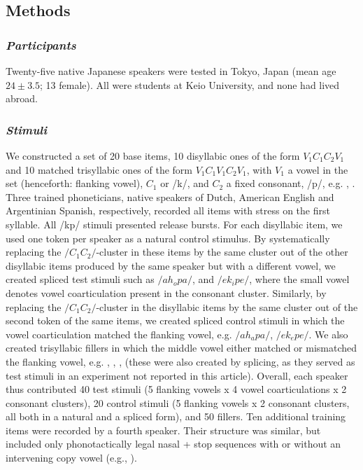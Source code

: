 \subsection{Methods}

\subsubsection{\textit{Participants}}

Twenty-five native Japanese speakers were tested in Tokyo, Japan (mean age $24 \pm 3.5$; 13 female). All were students at Keio University, and none had lived abroad. 

\subsubsection{\textit{Stimuli}}

We constructed a set of 20 base items, 10 disyllabic ones of the form $V_{1}C_{1}C_{2}V_{1}$ and 10 matched trisyllabic ones of the form $V_{1}C_{1}V_{1}C_{2}V_{1}$, 
with $V_{1}$ a vowel in the set  (henceforth: flanking vowel), $C_{1}$  or /k/, and $C_{2}$ a fixed consonant, /p/, e.g. , . Three trained phoneticians, native speakers of Dutch, American English and Argentinian Spanish, respectively, recorded all items with stress on the first syllable. All /kp/ stimuli presented release bursts. For each disyllabic item, we used one token per speaker as a natural control stimulus. By systematically replacing the $/C_{1}C_{2}/$-cluster in these items by the same cluster out of the other disyllabic items produced by the same speaker but with a different vowel, we created spliced test stimuli such as $/ah_{o}pa/$, and $/ek_{i}pe/$, where the small vowel denotes vowel coarticulation present in the consonant cluster. Similarly, by replacing the $/C_{1}C_{2}/$-cluster in the disyllabic items by the same cluster out of the second token of the same items, we created spliced control stimuli in which the vowel coarticulation matched the flanking vowel, e.g. $/ah_{a}pa/$, $/ek_{e}pe/$. We also created trisyllabic fillers in which the middle vowel either matched or mismatched the flanking vowel, e.g. , , ,  (these were also created by splicing, as they served as test stimuli in an experiment not reported in this article). Overall, each speaker thus contributed 40 test stimuli (5 flanking vowels x 4 vowel coarticulations x 2 consonant clusters), 20 control stimuli (5 flanking vowels x 2 consonant clusters, all both in a natural and a spliced form), and 50 fillers. Ten additional training items were recorded by a fourth speaker. Their structure was similar, but included only phonotactically legal nasal + stop sequences with or without an intervening copy vowel (e.g., ). 

